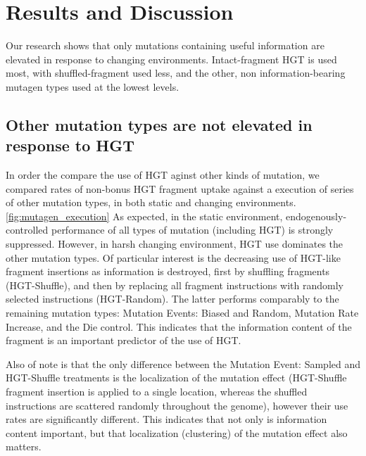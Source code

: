 \documentclass[PhD]{msu-thesis}
\begin{document}

\section{Results and Discussion}
Our research shows that only mutations containing useful information are elevated in response to changing environments. Intact-fragment HGT is used most, with shuffled-fragment used less, and the other, non information-bearing mutagen types used at the lowest levels.  

\subsection{Other mutation types are not elevated in response to HGT}

In order the compare the use of HGT aginst other kinds of mutation, we compared rates of non-bonus HGT fragment uptake against a execution of series of other mutation types, in both static and changing environments.\ref{fig:mutagen_execution} As expected, in the static environment, endogenously-controlled performance of all types of mutation (including HGT) is strongly suppressed. However, in harsh changing environment, HGT use dominates the other mutation types. Of particular interest is the decreasing use of HGT-like fragment insertions as information is destroyed, first by shuffling fragments (HGT-Shuffle), and then by replacing all fragment instructions with randomly selected instructions (HGT-Random). The latter performs comparably to the remaining mutation types: Mutation Events: Biased and Random, Mutation Rate Increase, and the Die control. This indicates that the information content of the fragment is an important predictor of the use of HGT. 

Also of note is that the only difference between the Mutation Event: Sampled and HGT-Shuffle treatments is the localization of the mutation effect (HGT-Shuffle fragment insertion is applied to a single location, whereas the shuffled instructions are scattered randomly throughout the genome), however their use rates are significantly different. This indicates that not only is information content important, but that localization (clustering) of the mutation effect also matters.
\end{document}
